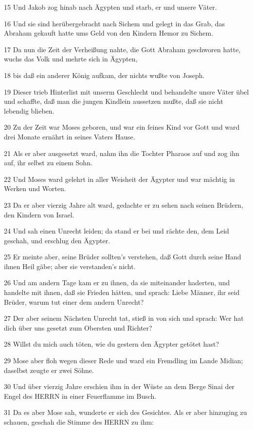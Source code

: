 \par 15 Und Jakob zog hinab nach Ägypten und starb, er und unsere Väter.
\par 16 Und sie sind herübergebracht nach Sichem und gelegt in das Grab, das Abraham gekauft hatte ums Geld von den Kindern Hemor zu Sichem.
\par 17 Da nun die Zeit der Verheißung nahte, die Gott Abraham geschworen hatte, wuchs das Volk und mehrte sich in Ägypten,
\par 18 bis daß ein anderer König aufkam, der nichts wußte von Joseph.
\par 19 Dieser trieb Hinterlist mit unserm Geschlecht und behandelte unsre Väter übel und schaffte, daß man die jungen Kindlein aussetzen mußte, daß sie nicht lebendig blieben.
\par 20 Zu der Zeit war Moses geboren, und war ein feines Kind vor Gott und ward drei Monate ernährt in seines Vaters Hause.
\par 21 Als er aber ausgesetzt ward, nahm ihn die Tochter Pharaos auf und zog ihn auf, ihr selbst zu einem Sohn.
\par 22 Und Moses ward gelehrt in aller Weisheit der Ägypter und war mächtig in Werken und Worten.
\par 23 Da er aber vierzig Jahre alt ward, gedachte er zu sehen nach seinen Brüdern, den Kindern von Israel.
\par 24 Und sah einen Unrecht leiden; da stand er bei und rächte den, dem Leid geschah, und erschlug den Ägypter.
\par 25 Er meinte aber, seine Brüder sollten's verstehen, daß Gott durch seine Hand ihnen Heil gäbe; aber sie verstanden's nicht.
\par 26 Und am andern Tage kam er zu ihnen, da sie miteinander haderten, und handelte mit ihnen, daß sie Frieden hätten, und sprach: Liebe Männer, ihr seid Brüder, warum tut einer dem andern Unrecht?
\par 27 Der aber seinem Nächsten Unrecht tat, stieß in von sich und sprach: Wer hat dich über uns gesetzt zum Obersten und Richter?
\par 28 Willst du mich auch töten, wie du gestern den Ägypter getötet hast?
\par 29 Mose aber floh wegen dieser Rede und ward ein Fremdling im Lande Midian; daselbst zeugte er zwei Söhne.
\par 30 Und über vierzig Jahre erschien ihm in der Wüste an dem Berge Sinai der Engel des HERRN in einer Feuerflamme im Busch.
\par 31 Da es aber Mose sah, wunderte er sich des Gesichtes. Als er aber hinzuging zu schauen, geschah die Stimme des HERRN zu ihm:
